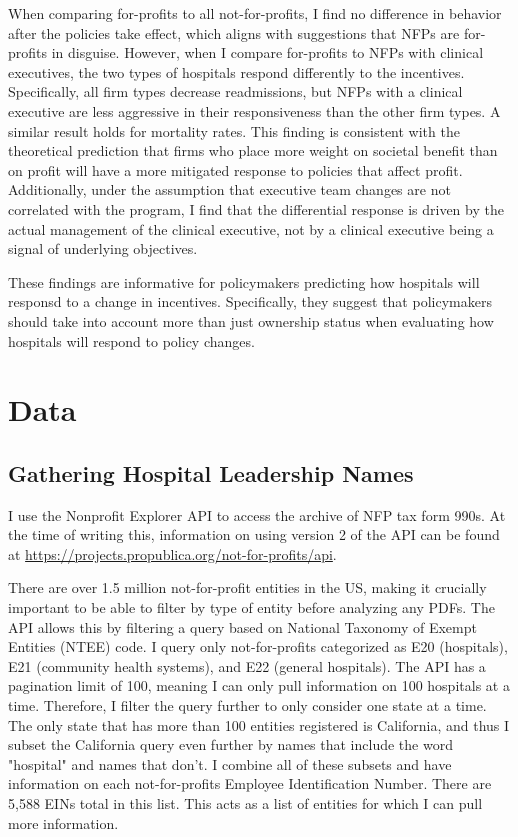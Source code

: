 \documentclass[12pt]{article}
\begin{document}
     When comparing for-profits to all not-for-profits, I find no difference in behavior after the policies take effect, which aligns with suggestions that NFPs are for-profits in disguise. However, when I compare for-profits to NFPs with clinical executives, the two types of hospitals respond differently to the incentives. Specifically, all firm types decrease readmissions, but NFPs with a clinical executive are less aggressive in their responsiveness than the other firm types. A similar result holds for mortality rates. This finding is consistent with the theoretical prediction that firms who place more weight on societal benefit than on profit will have a more mitigated response to policies that affect profit. Additionally, under the assumption that executive team changes are not correlated with the program, I find that the differential response is driven by the actual management of the clinical executive, not by a clinical executive being a signal of underlying objectives. 
     
     These findings are informative for policymakers predicting how hospitals will responsd to a change in incentives. Specifically, they suggest that policymakers should take into account more than just ownership status when evaluating how hospitals will respond to policy changes. 

	
	\newpage

    \printbibliography

\appendix

 \section{Data}\label{appendixdata}

\subsection{Gathering Hospital Leadership Names}

I use the Nonprofit Explorer API to access the archive of NFP tax form 990s. At the time of writing this, information on using version 2 of the API can be found at \hyperlink{https://projects.propublica.org/not-for-profits/api}{https://projects.propublica.org/not-for-profits/api}. 
    
There are over 1.5 million not-for-profit entities in the US, making it crucially important to be able to filter by type of entity before analyzing any PDFs. The API allows this by filtering a query based on National Taxonomy of Exempt Entities (NTEE) code. I query only not-for-profits categorized as E20 (hospitals), E21 (community health systems), and E22 (general hospitals). The API has a pagination limit of 100, meaning I can only pull information on 100 hospitals at a time. Therefore, I filter the query further to only consider one state at a time. The only state that has more than 100 entities registered is California, and thus I subset the California query even further by names that include the word "hospital" and names that don't. I combine all of these subsets and have information on each not-for-profits Employee Identification Number. There are 5,588 EINs total in this list. This acts as a list of entities for which I can pull more information. 
\end{document}
